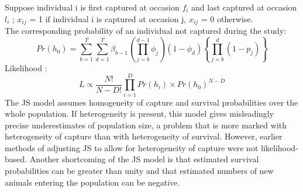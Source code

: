\documentclass[,oneside]{article}
\numberwithin{equation}{section}
\begin{document}
Suppose individual i is first captured at occasion $f_i$ and last captured at occasion $l_i$ ; $x_{ij}$ = 1 if individual i is captured at occasion j, $x_{ij}$ = 0 otherwise.\\
The corresponding probability of an individual not captured during the study:\\
\begin{equation}
Pr(h_0)=\sum_{b=1}^{T}\sum_{d=1}^{T}\beta_{b-1}\left(\prod_{j=b}^{d-1}\phi_j\right)(1-\phi_d)\left\{\prod_{j=b}^{d}(1-p_j)\right\}
\end{equation}
Likelihood \cite{Ap93}:\\
\begin{equation}
L\propto\frac{N!}{N-D!}\prod_{i=1}^{D}Pr(h_i)\times Pr(h_0)^{N-D}
\end{equation} 
The JS model assumes homogeneity of capture and survival probabilities over the whole population. If heterogeneity is present, this model gives misleadingly precise underestimates of population size, a problem that is more marked with heterogeneity of capture than with heterogeneity of survival. However, earlier methods of adjusting JS to allow for heterogeneity of capture were not likelihood-based. \cite{Ap91} Another shortcoming of the JS model is that estimated survival probabilities can be greater than unity and that estimated numbers of new animals entering the population can be negative. \cite{Ap95} 
\end{document}
